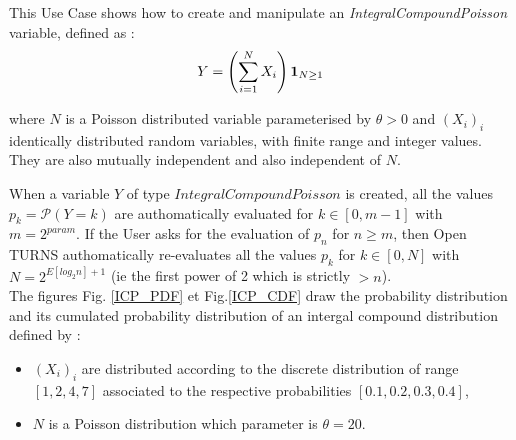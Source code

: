 This Use Case shows how to create and manipulate an {\itshape IntegralCompoundPoisson} variable, defined as :
\begin{equation}
Y = \left( \displaystyle \sum_{i=1}^{N}X_i \right){\mathbf 1}_{N\geq 1}
\end{equation}

where $N$ is a Poisson distributed variable  parameterised by $\theta > 0$ and $(X_i)_i$  identically distributed random variables, with finite range and integer values. They are also mutually independent and also independent of $N$.

When a variable $Y$ of type $IntegralCompoundPoisson$ is created, all the values $p_k = \mathcal{P}(Y=k)$ are authomatically evaluated for $k \in [0, m-1]$ with $m = 2^{param}$. If the User asks for the evaluation of $p_n$ for $n \geq m$, then Open TURNS authomatically re-evaluates  all the values   $p_k$ for $k \in [0, N]$  with $N   = 2^{E[log_2 n]+1}$ (ie the first power of 2 which is strictly  $>n$).\\

The figures Fig. \ref{ICP_PDF} et Fig.\ref{ICP_CDF} draw the probability distribution and its cumulated probability distribution of an intergal compound distribution defined by : 
\begin{itemize}
  \item $(X_i)_i$ are distributed according to  the discrete distribution of range $[1, 2, 4, 7]$ associated to the respective probabilities $[0.1, 0.2, 0.3, 0.4]$,
  \item $N$ is a Poisson distribution which parameter is $\theta = 20$.
\end{itemize}


